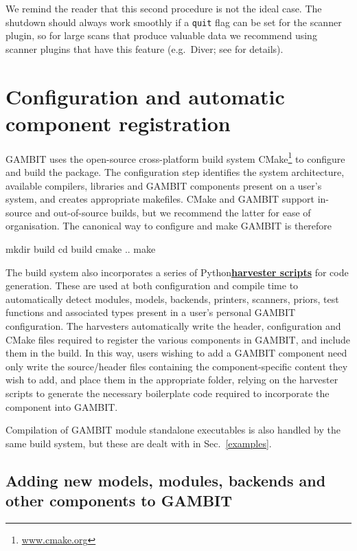 \documentclass[pdftex,twocolumn,epjc3_preprint,runningheads]{svjour3}
\renewcommand{\_}{\discretionary{\underscore}{}{\underscore}}
\newcommand\cpp[1]{{\lstinline!#1!}}  %
\newcommand{\doublecross}[2]{\hyperref[#2]{\textbf{#1}}}
\newcommand{\gambit}{\textsf{GAMBIT}\xspace}
\newcommand{\GB}{\gambit}
\newcommand\diver{\textsf{Diver}\xspace}
\newcommand\Python{\textsf{Python}\xspace}
\newcommand\python{\Python}
\renewcommand{\url}[1]{\href{#1}{#1}}
\begin{document}
We remind the reader that this second procedure is not the ideal case. The shutdown should always work smoothly if a \cpp{quit} flag can be set for the scanner plugin, so for large scans that produce valuable data we recommend using scanner plugins that have this feature (e.g.\ \diver; see \cite{ScannerBit} for details).

\section{Configuration and automatic component registration}
\label{cmake}

\GB uses the open-source cross-platform build system \textsf{CMake}\footnote{\url{www.cmake.org}} to configure and build the package. The configuration step identifies the system architecture, available compilers, libraries and \GB components present on a user's system, and creates appropriate makefiles.  \textsf{CMake} and \GB support in-source and out-of-source builds, but we recommend the latter for ease of organisation.  The canonical way to configure and make \GB is therefore
\begin{lstterm}
mkdir build
cd build
cmake ..
make
\end{lstterm}

The build system also incorporates a series of \python \doublecross{harvester scripts}{harvester script} for code generation.  These are used at both configuration and compile time to automatically detect modules, models, backends, printers, scanners, priors, test functions and associated types present in a user's personal \GB configuration.  The harvesters automatically write the header, configuration and \textsf{CMake} files required to register the various components in \GB, and include them in the build.  In this way, users wishing to add a \GB component need only write the source/header files containing the component-specific content they wish to add, and place them in the appropriate folder, relying on the harvester scripts to generate the necessary boilerplate code required to incorporate the component into \GB.

Compilation of \GB module standalone executables is also handled by the same build system, but these are dealt with in Sec.\ \ref{examples}.

\subsection{Adding new models, modules, backends and other components to \GB}
\label{adding_components}
\end{document}
